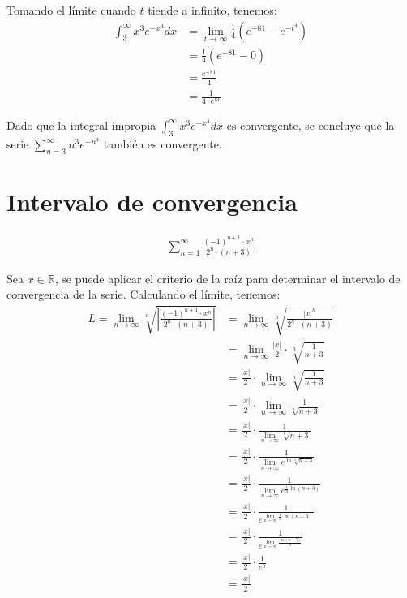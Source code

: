 \documentclass{article}
\newcommand{\R}{\mathbb{R}}
\begin{document}
Tomando el límite cuando $t$ tiende a infinito, tenemos:
\begin{align*}
\int_3^{\infty} x^3 e^{-x^4} dx &= \lim_{t \to \infty} \frac{1}{4} \left( e^{-81} - e^{-t^4} \right) \\
&= \frac{1}{4} \left( e^{-81} - 0 \right) \\
&= \frac{e^{-81}}{4} \\
&= \boxed{\frac{1}{4 \cdot e^{81}}}
\end{align*}

Dado que la integral impropia $\int_3^{\infty} x^3 e^{-x^4} dx$ es convergente, se concluye que la serie $\sum_{n=3}^{\infty} n^3 e^{-n^4}$ también es convergente.

\section{Intervalo de convergencia}

\begin{align*}
\sum_{n=1}^{\infty} \frac{(-1)^{n+1} \cdot x^n}{2^n \cdot (n+3)}
\end{align*}

Sea $x \in \R$, se puede aplicar el criterio de la raíz para determinar el intervalo de convergencia de la serie. Calculando el límite, tenemos:
\begin{align*}
L = \lim_{n \to \infty} \sqrt[n]{\left|\frac{(-1)^{n+1} \cdot x^n}{2^n \cdot (n+3)}\right|} &= \lim_{n \to \infty} \sqrt[n]{\frac{|x|^n}{2^n \cdot (n+3)}} \\
&= \lim_{n \to \infty} \frac{|x|}{2} \cdot \sqrt[n]{\frac{1}{n+3}} \\
&= \frac{|x|}{2} \cdot \lim_{n \to \infty} \sqrt[n]{\frac{1}{n+3}} \\
&= \frac{|x|}{2} \cdot \lim_{n \to \infty} \frac{1}{\sqrt[n]{n+3}} \\
&= \frac{|x|}{2} \cdot \frac{1}{\lim_{n \to \infty} \sqrt[n]{n+3}} \\
&= \frac{|x|}{2} \cdot \frac{1}{\lim_{n \to \infty} e^{\ln \sqrt[n]{n+3}}} \\
&= \frac{|x|}{2} \cdot \frac{1}{\lim_{n \to \infty} e^{\frac{1}{n} \ln (n+3)}} \\
&= \frac{|x|}{2} \cdot \frac{1}{e^{\lim_{n \to \infty} \frac{1}{n} \ln (n+3)}} \\
&= \frac{|x|}{2} \cdot \frac{1}{e^{\lim_{n \to \infty} \frac{\ln (n+3)}{n}}} \\
&= \frac{|x|}{2} \cdot \frac{1}{e^0} \\
&= \frac{|x|}{2}
\end{align*}
\end{document}
